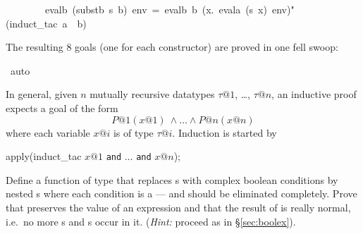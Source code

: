 \begin{isabelle}
~~~~~~~~evalb~(substb~s~b)~env~=~evalb~b~({\isasymlambda}x.~evala~(s~x)~env){"}\isanewline
{}(induct\_tac~a~~b)%
\begin{isamarkuptxt}%
\noindent
The resulting 8 goals (one for each constructor) are proved in one fell swoop:%
\end{isamarkuptxt}%
~auto%
\begin{isamarkuptext}%
In general, given $n$ mutually recursive datatypes $\tau@1$, \dots, $\tau@n$,
an inductive proof expects a goal of the form
\[ P@1(x@1)\ \land \dots \land P@n(x@n) \]
where each variable $x@i$ is of type $\tau@i$. Induction is started by
\begin{ttbox}
apply(induct_tac \(x@1\) \texttt{and} \(\dots\) \texttt{and} \(x@n\));
\end{ttbox}

\begin{exercise}
  Define a function  of type  that
  replaces s with complex boolean conditions by nested
  s where each condition is a  ---  and
   should be eliminated completely. Prove that 
  preserves the value of an expression and that the result of 
  is really normal, i.e.\ no more s and s occur in
  it.  ({\em Hint:} proceed as in \S\ref{sec:boolex}).
\end{exercise}%
\end{isamarkuptext}%
\end{isabelle}%
